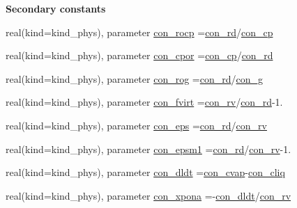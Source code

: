 \begin{Indent}{\bf Secondary constants}\par
\begin{DoxyCompactItemize}
\item 
real(kind=kind\+\_\+phys), parameter \hyperlink{namespacephyscons_a72b27573c69ec418b67763d35b3688a1}{con\+\_\+rocp} =\hyperlink{namespacephyscons_ac7dc37b0005878c5fd2f200720ffb059}{con\+\_\+rd}/\hyperlink{namespacephyscons_a29704d9a27091d61724e1a0c654d0f10}{con\+\_\+cp}
\item 
real(kind=kind\+\_\+phys), parameter \hyperlink{namespacephyscons_aa70e90bc808832d61159e7ecda5212c5}{con\+\_\+cpor} =\hyperlink{namespacephyscons_a29704d9a27091d61724e1a0c654d0f10}{con\+\_\+cp}/\hyperlink{namespacephyscons_ac7dc37b0005878c5fd2f200720ffb059}{con\+\_\+rd}
\item 
real(kind=kind\+\_\+phys), parameter \hyperlink{namespacephyscons_af9c8d062e83de66ed309224af5644450}{con\+\_\+rog} =\hyperlink{namespacephyscons_ac7dc37b0005878c5fd2f200720ffb059}{con\+\_\+rd}/\hyperlink{namespacephyscons_a7aa20dba53943ce9bcecb2ebef0e308d}{con\+\_\+g}
\item 
real(kind=kind\+\_\+phys), parameter \hyperlink{namespacephyscons_ad200a2d8149c61dbdd05124ce977a928}{con\+\_\+fvirt} =\hyperlink{namespacephyscons_a3ae962da4c7a9cb83c4a2abe743696b0}{con\+\_\+rv}/\hyperlink{namespacephyscons_ac7dc37b0005878c5fd2f200720ffb059}{con\+\_\+rd}-\/1.
\item 
real(kind=kind\+\_\+phys), parameter \hyperlink{namespacephyscons_a25c0b5ef7ed84a574bf7e215ddaee65d}{con\+\_\+eps} =\hyperlink{namespacephyscons_ac7dc37b0005878c5fd2f200720ffb059}{con\+\_\+rd}/\hyperlink{namespacephyscons_a3ae962da4c7a9cb83c4a2abe743696b0}{con\+\_\+rv}
\item 
real(kind=kind\+\_\+phys), parameter \hyperlink{namespacephyscons_a2ca326d6f385fb0100c05ed44b20c345}{con\+\_\+epsm1} =\hyperlink{namespacephyscons_ac7dc37b0005878c5fd2f200720ffb059}{con\+\_\+rd}/\hyperlink{namespacephyscons_a3ae962da4c7a9cb83c4a2abe743696b0}{con\+\_\+rv}-\/1.
\item 
real(kind=kind\+\_\+phys), parameter \hyperlink{namespacephyscons_a04a189b8dc4814d5d519b4b92ec0cf31}{con\+\_\+dldt} =\hyperlink{namespacephyscons_a0fc6465a87263f2fd3576365c485f81e}{con\+\_\+cvap}-\/\hyperlink{namespacephyscons_a63660b93c455c1f072ade649bf87cadc}{con\+\_\+cliq}
\item 
real(kind=kind\+\_\+phys), parameter \hyperlink{namespacephyscons_a27a44ed341fdf3b37b2052e8b8aa7690}{con\+\_\+xpona} =-\/\hyperlink{namespacephyscons_a04a189b8dc4814d5d519b4b92ec0cf31}{con\+\_\+dldt}/\hyperlink{namespacephyscons_a3ae962da4c7a9cb83c4a2abe743696b0}{con\+\_\+rv}

\end{DoxyCompactItemize}
\end{Indent}

